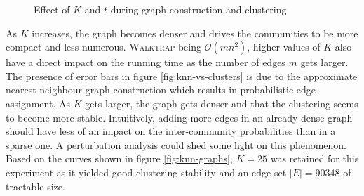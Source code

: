 \documentclass[12pt, oneside, extrafontsizes]{memoir}  %
\theoremstyle{plain}
\theoremstyle{definition}
\begin{document}
\begin{figure}
\centering
{}\hspace{2mm}%
\label{fig:pinball-graph}
\caption{Effect of $K$ and $t$ during graph construction and clustering}
\end{figure}

As $K$ increases, the graph becomes denser and drives the communities to be more compact and less numerous. \textsc{Walktrap} being $\mathcal{O}(mn^2)$, higher values of $K$ also have a direct impact on the running time as the number of edges $m$ gets larger. The presence of error bars in figure \ref{fig:knn-vs-clusters} is due to the approximate nearest neighbour graph construction which results in probabilistic edge assignment. As $K$ gets larger, the graph gets denser and that the clustering seems to become more stable. Intuitively, adding more edges in an already dense graph should have less of an impact on the inter-community probabilities than in a sparse one. A perturbation analysis could shed some light on this phenomenon. Based on the curves shown in figure \ref{fig:knn-graphs}, $K=25$ was retained for this experiment as it yielded good clustering stability and an edge set $|E| = 90348$ of tractable size. 
\end{document}
